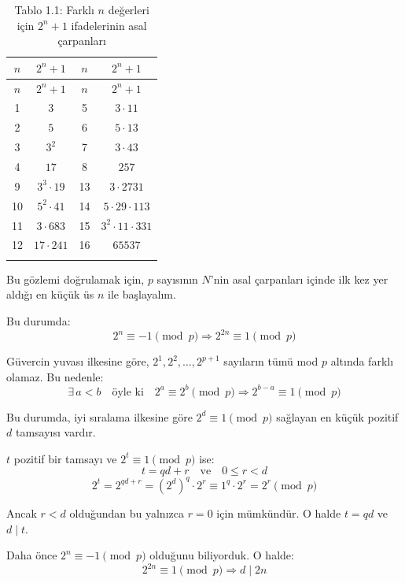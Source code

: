 \begin{longtable}{|c|c|c|c|}
\hline
\textbf{$n$} & \textbf{$2^n + 1$} & \textbf{$n$} & \textbf{$2^n + 1$} \\
\hline
\endfirsthead
\hline
\textbf{$n$} & \textbf{$2^n + 1$} & \textbf{$n$} & \textbf{$2^n + 1$} \\
\hline
\endhead
\hline
1  & $3$                     & 5  & $3 \cdot 11$ \\
2  & $5$                     & 6  & $5 \cdot 13$ \\
3  & $3^2$                   & 7  & $3 \cdot 43$ \\
4  & $17$                    & 8  & $257$ \\
9  & $3^3 \cdot 19$          & 13 & $3 \cdot 2731$ \\
10 & $5^2 \cdot 41$          & 14 & $5 \cdot 29 \cdot 113$ \\
11 & $3 \cdot 683$           & 15 & $3^2 \cdot 11 \cdot 331$ \\
12 & $17 \cdot 241$          & 16 & $65537$ \\
\hline
\caption{Tablo 1.1: Farklı $n$ değerleri için $2^n + 1$ ifadelerinin asal çarpanları}
\label{tab:2nplus1}
\end{longtable}

\vspace{1em}

Bu gözlemi doğrulamak için, $p$ sayısının $N$'nin asal çarpanları içinde ilk kez yer aldığı en küçük üs $n$ ile başlayalım.

Bu durumda:  
\[
2^n \equiv -1 \pmod{p} \Rightarrow 2^{2n} \equiv 1 \pmod{p}
\]

Güvercin yuvası ilkesine göre, $2^1, 2^2, \ldots, 2^{p+1}$ sayıların tümü mod $p$ altında farklı olamaz. Bu nedenle:
\[
\exists \, a < b \quad \text{öyle ki} \quad 2^a \equiv 2^b \pmod{p} \Rightarrow 2^{b-a} \equiv 1 \pmod{p}
\]

Bu durumda, iyi sıralama ilkesine göre $2^d \equiv 1 \pmod{p}$ sağlayan en küçük pozitif $d$ tamsayısı vardır.

$t$ pozitif bir tamsayı ve $2^t \equiv 1 \pmod{p}$ ise:
\[
t = qd + r \quad \text{ve} \quad 0 \leq r < d
\]
\[
2^t = 2^{qd + r} = (2^d)^q \cdot 2^r \equiv 1^q \cdot 2^r = 2^r \pmod{p}
\]

Ancak $r < d$ olduğundan bu yalnızca $r = 0$ için mümkündür. O halde $t = qd$ ve $d \mid t$.

\bigskip

Daha önce $2^n \equiv -1 \pmod{p}$ olduğunu biliyorduk. O halde:
\[
2^{2n} \equiv 1 \pmod{p} \Rightarrow d \mid 2n
\]

